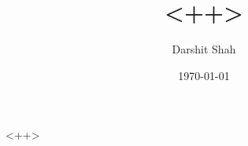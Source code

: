 \documentclass[a4paper,10pt,final]{article}
\author{Darshit Shah}
\date{\today}
\title{<++>}
\begin{document}
\maketitle
<++>
\end{document}
